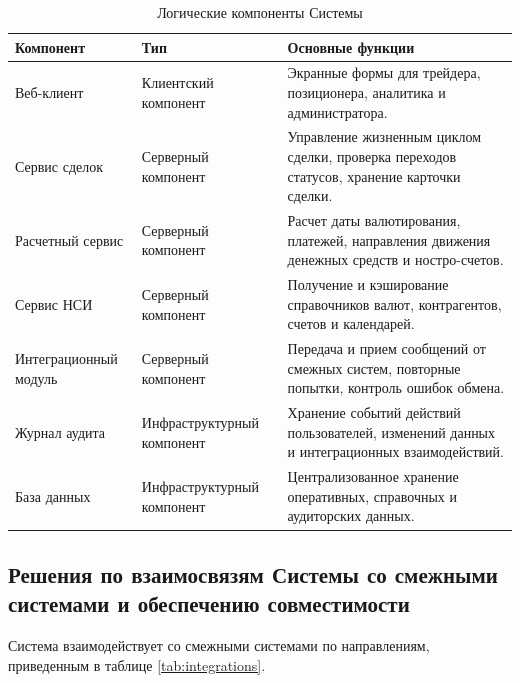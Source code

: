 \documentclass[a4paper,14pt]{extarticle}
\begin{document}
\begin{table}[H]
\centering
\small
\caption{Логические компоненты Системы}
\label{tab:components}
\begin{tabularx}{\linewidth}{|L{40mm}|L{35mm}|X|}
\hline
\textbf{Компонент} & \textbf{Тип} & \textbf{Основные функции} \\
\hline
Веб-клиент & Клиентский компонент & Экранные формы для трейдера, позиционера, аналитика и администратора. \\
\hline
Сервис сделок & Серверный компонент & Управление жизненным циклом сделки, проверка переходов статусов, хранение карточки сделки. \\
\hline
Расчетный сервис & Серверный компонент & Расчет даты валютирования, платежей, направления движения денежных средств и ностро-счетов. \\
\hline
Сервис НСИ & Серверный компонент & Получение и кэширование справочников валют, контрагентов, счетов и календарей. \\
\hline
Интеграционный модуль & Серверный компонент & Передача и прием сообщений от смежных систем, повторные попытки, контроль ошибок обмена. \\
\hline
Журнал аудита & Инфраструктурный компонент & Хранение событий действий пользователей, изменений данных и интеграционных взаимодействий. \\
\hline
База данных & Инфраструктурный компонент & Централизованное хранение оперативных, справочных и аудиторских данных. \\
\hline
\end{tabularx}
\end{table}

\subsection{Решения по взаимосвязям Системы со смежными системами и обеспечению совместимости}
Система взаимодействует со смежными системами по направлениям, приведенным в таблице \ref{tab:integrations}.
\end{document}
